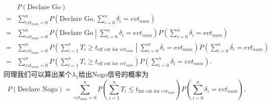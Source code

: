 \documentclass[a4paper,12pt]{article}
\begin{document}
\[
  \begin{aligned}
    & P\left(\text{Declare Go}\right)    \\
    =& \sum\limits_{evt_{num} = 0}^{n}P\left(
      \text{Declare Go}, \sum\limits_{i = 0}^n\delta_i = evt_{num}
    \right)    \\
    =& \sum\limits_{evt_{num} = 0}^{n}P\left(
      \text{Declare Go}\middle| \sum\limits_{i = 0}^n\delta_i = evt_{num}
    \right)
    P\left(\sum\limits_{i = 0}^n\delta_i = evt_{num}\right)    \\
    =& \sum\limits_{evt_{num} = 0}^{n}
    P\left(
      \sum\limits_{i = 1}^nT_i \geq t_{\text{eff cut for } evt_{num}}
      \middle| \sum\limits_{i = 0}^n\delta_i = evt_{num}
    \right)
    P\left(\sum\limits_{i = 0}^n\delta_i = evt_{num}\right)    \\
    =& \sum\limits_{evt_{num} = 0}^{n}
    P\left(
      \sum\limits_{i = 1}^nT_i \geq t_{\text{eff cut for } evt_{num}}
    \right)
    P\left(\sum\limits_{i = 0}^n\delta_i = evt_{num}\right)
    .
  \end{aligned}
\]
同理我们可以算出某个$\lambda_1$给出Nogo信号的概率为
\[
  P\left(\text{Declare Nogo}\right)
  = \sum\limits_{evt_{num} = 0}^{n}
    P\left(
      \sum\limits_{i = 1}^nT_i \leq t_{\text{fut cut for } evt_{num}}
    \right)
    P\left(\sum\limits_{i = 0}^n\delta_i = evt_{num}\right)
    .
\]






\clearpage
\appendix
\end{document}
